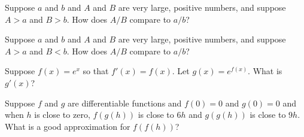 \documentclass{ximera}
\newcommand{\recommendation}[1]{}
\begin{document}
\begin{shuffle}
\begin{problem}
  Suppose $a$ and $b$ and $A$ and $B$ are very large, positive numbers, and suppose $A > a$ and $B > b$.  How does $A/B$ compare to $a/b$?
  \begin{multipleChoice}
  \end{multipleChoice}
\end{problem}

\begin{problem}
  Suppose $a$ and $b$ and $A$ and $B$ are very large, positive numbers, and suppose $A > a$ and $B < b$.  How does $A/B$ compare to $a/b$?
  \begin{multipleChoice}
  \end{multipleChoice}
\end{problem}



\begin{problem}
  Suppose $f(x) = e^x$ so that $f'(x) = f(x)$.  Let $g(x) = e^{f(x)}$.  What is $g'(x)$?
  \begin{multipleChoice}
  \end{multipleChoice}
\end{problem}

\begin{problem}
  Suppose $f$ and $g$ are differentiable functions and $f(0) = 0$ and
  $g(0) = 0$ and when $h$ is close to zero, $f(g(h))$ is close to $6h$
  and $g(g(h))$ is close to $9h$.  What is a good approximation for $f(f(h))$?
  \begin{multipleChoice}
  \end{multipleChoice}
\end{problem}


\end{shuffle}
\end{document}
